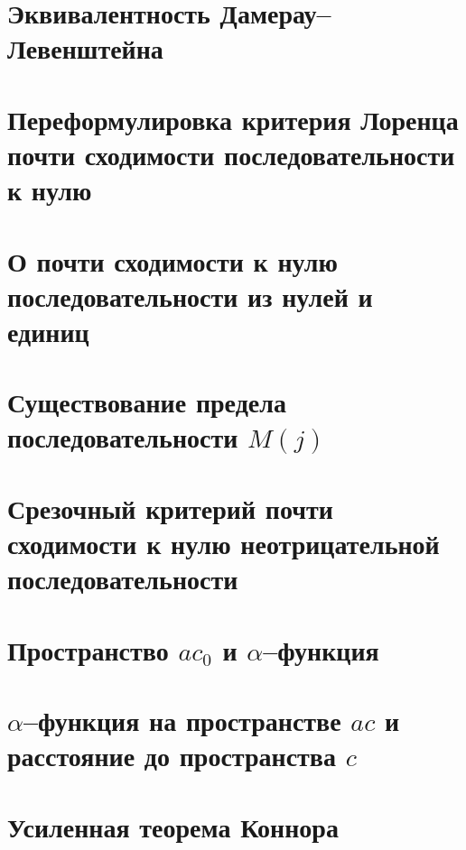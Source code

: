 \documentclass[12pt,a4paper,openbib]{report}
\theoremstyle{definition}
\begin{document}
	

	\section{Эквивалентность Дамерау--Левенштейна}
	

	\section{Переформулировка критерия Лоренца почти сходимости последовательности к нулю}
	

	\section{О почти сходимости к нулю последовательности из нулей и единиц}
	
	

	\section{Существование предела последовательности $M(j)$}
	

	\section{Срезочный критерий почти сходимости к нулю неотрицательной последовательности}
	

	\section{Пространство $ac_0$ и $\alpha$--функция}
	

	\section{$\alpha$--функция на пространстве $ac$ и расстояние до пространства $c$}
	

	\section{Усиленная теорема Коннора}
	
\end{document}
